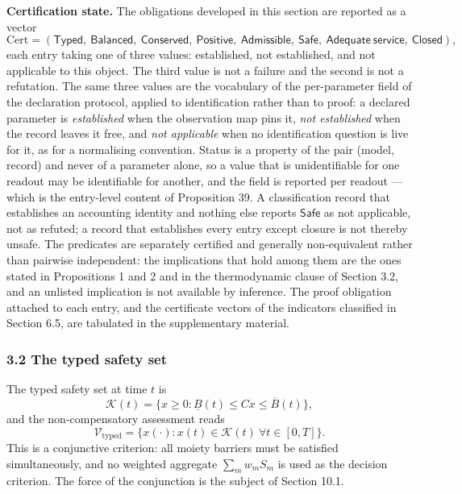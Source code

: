 \documentclass[11pt]{article}
\begin{document}
\textbf{Certification state.} The obligations developed in this section are reported as a vector
\[ \mathrm{Cert}=(\mathsf{Typed},\ \mathsf{Balanced},\ \mathsf{Conserved},\ \mathsf{Positive},\ \mathsf{Admissible},\ \mathsf{Safe},\ \mathsf{Adequate\ service},\ \mathsf{Closed}), \]
each entry taking one of three values: established, not established, and not applicable to this
object. The third value is not a failure and the second is not a refutation. The same three values are the
vocabulary of the per-parameter field of the declaration protocol, applied to identification rather than to
proof: a declared parameter is \emph{established} when the observation map pins it, \emph{not established} when the
record leaves it free, and \emph{not applicable} when no identification question is live for it, as for a
normalising convention. Status is a property of the pair (model, record) and never of a parameter alone, so a
value that is unidentifiable for one readout may be identifiable for another, and the field is reported per
readout --- which is the entry-level content of Proposition 39. A classification record
that establishes an accounting identity and nothing else reports \(\mathsf{Safe}\) as not applicable,
not as refuted; a record that establishes every entry except closure is not thereby unsafe. The
predicates are separately certified and generally non-equivalent rather than pairwise independent:
the implications that hold among them are the ones stated in Propositions 1 and 2 and in the
thermodynamic clause of Section 3.2, and an unlisted implication is not available by inference. The
proof obligation attached to each entry, and the certificate vectors of the indicators classified in
Section 6.5, are tabulated in the supplementary material.


\subsubsection{3.2 The typed safety set}\label{the-typed-safety-set}

The typed safety set at time \(t\) is
\[\mathcal{K}(t) = \{ x \ge 0 : \underline{B}(t) \le Cx \le \overline{B}(t) \},\]
and the non-compensatory assessment reads
\[\mathcal{V}_{\mathrm{typed}} = \{ x(\cdot) : x(t) \in \mathcal{K}(t)\ \forall t \in [0,T] \}.\]
This is a conjunctive criterion: all moiety barriers must be satisfied
simultaneously, and no weighted aggregate \(\sum_m w_m S_m\) is used as
the decision criterion. The force of the conjunction is the subject of
Section 10.1.
\end{document}
